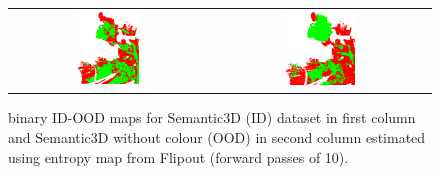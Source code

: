 \begin{figure}[h!]
\begin{tabular}{cc}
            \includegraphics[width=0.33\textwidth, height=0.18\textheight]{images/ood_imgs/sem3d_of/ent/fout_sem3d_OOD_3.pdf}&
            \includegraphics[width=0.33\textwidth, height=0.18\textheight]{images/ood_imgs/sem3d_of/ent/fout_sem3d_of_OOD_3.pdf}\\
        \end{tabular}
        \caption{binary ID-OOD maps for Semantic3D (ID) dataset in first column and Semantic3D without colour (OOD) in second column estimated using entropy map from Flipout (forward passes of 10).}
        \label{fig:fout_oodmap_sem3d_OF_ent}
    \end{figure} 
    \FloatBarrier

